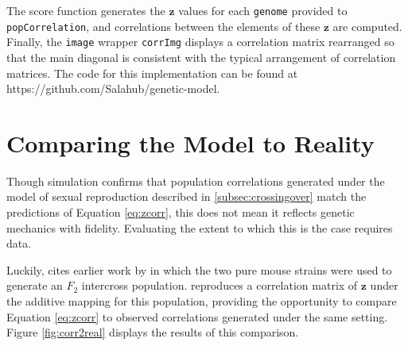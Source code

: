 \documentclass{article}
\newcommand{\code}[1]{\texttt{#1}}
\newcommand{\ve}[1]{\mathbf{#1}}           %
\begin{document}
The score function generates the $\ve{z}$ values for each \code{genome} provided to \code{popCorrelation}, and correlations between the elements of these $\ve{z}$ are computed. Finally, the \code{image} wrapper \code{corrImg} displays a correlation matrix rearranged so that the main diagonal is consistent with the typical arrangement of correlation matrices. The code for this implementation can be found at https://github.com/Salahub/genetic-model.

\section{Comparing the Model to Reality} \label{subsec:model2real}

Though simulation confirms that population correlations generated under the model of sexual reproduction described in \ref{subsec:crossingover} match the predictions of Equation \ref{eq:zcorr}, this does not mean it reflects genetic mechanics with fidelity. Evaluating the extent to which this is the case requires data.

Luckily, \cite{cheverud2001} cites earlier work by \cite{cheverudetal2001} in which the two pure mouse strains were used to generate an $F_2$ intercross population. \cite{cheverud2001} reproduces a correlation matrix of $\ve{z}$ under the additive mapping for this population, providing the opportunity to compare Equation \ref{eq:zcorr} to observed correlations generated under the same setting. Figure \ref{fig:corr2real} displays the results of this comparison.
\end{document}
